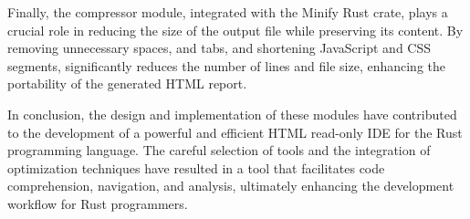 Finally, the compressor module, integrated with the Minify Rust crate, plays a crucial role in reducing the size of the output file while preserving its content. By removing unnecessary spaces, and tabs, and shortening JavaScript and CSS segments, significantly reduces the number of lines and file size, enhancing the portability of the generated HTML report.

In conclusion, the design and implementation of these modules have contributed to the development of a powerful and efficient HTML read-only IDE for the Rust programming language. The careful selection of tools and the integration of optimization techniques have resulted in a tool that facilitates code comprehension, navigation, and analysis, ultimately enhancing the development workflow for Rust programmers.


